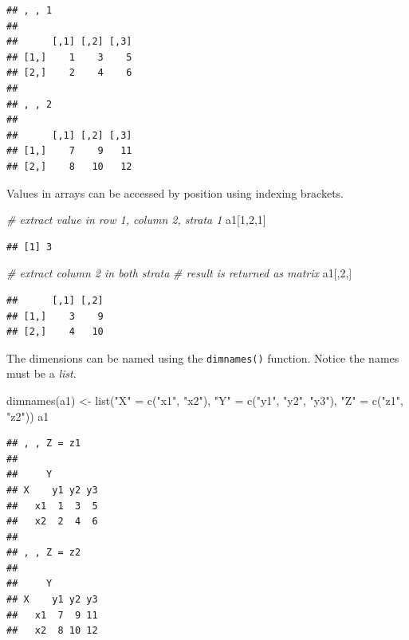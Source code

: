 \documentclass[
]{book}
\newenvironment{Shaded}{\begin{snugshade}}{\end{snugshade}}
\newcommand{\CommentTok}[1]{\textcolor[rgb]{0.56,0.35,0.01}{\textit{#1}}}
\newcommand{\DecValTok}[1]{\textcolor[rgb]{0.00,0.00,0.81}{#1}}
\newcommand{\FunctionTok}[1]{\textcolor[rgb]{0.00,0.00,0.00}{#1}}
\newcommand{\NormalTok}[1]{#1}
\newcommand{\OtherTok}[1]{\textcolor[rgb]{0.56,0.35,0.01}{#1}}
\newcommand{\StringTok}[1]{\textcolor[rgb]{0.31,0.60,0.02}{#1}}
\begin{document}
\begin{verbatim}
## , , 1
## 
##      [,1] [,2] [,3]
## [1,]    1    3    5
## [2,]    2    4    6
## 
## , , 2
## 
##      [,1] [,2] [,3]
## [1,]    7    9   11
## [2,]    8   10   12
\end{verbatim}

Values in arrays can be accessed by position using indexing brackets.

\begin{Shaded}
\begin{Highlighting}[]
\CommentTok{\# extract value in row 1, column 2, strata 1}
\NormalTok{a1[}\DecValTok{1}\NormalTok{,}\DecValTok{2}\NormalTok{,}\DecValTok{1}\NormalTok{]}
\end{Highlighting}
\end{Shaded}

\begin{verbatim}
## [1] 3
\end{verbatim}

\begin{Shaded}
\begin{Highlighting}[]
\CommentTok{\# extract column 2 in both strata}
\CommentTok{\# result is returned as matrix}
\NormalTok{a1[,}\DecValTok{2}\NormalTok{,]}
\end{Highlighting}
\end{Shaded}

\begin{verbatim}
##      [,1] [,2]
## [1,]    3    9
## [2,]    4   10
\end{verbatim}

The dimensions can be named using the \texttt{dimnames()} function. Notice the names must be a \emph{list}.

\begin{Shaded}
\begin{Highlighting}[]
\FunctionTok{dimnames}\NormalTok{(a1) }\OtherTok{\textless{}{-}} \FunctionTok{list}\NormalTok{(}\StringTok{"X"} \OtherTok{=} \FunctionTok{c}\NormalTok{(}\StringTok{"x1"}\NormalTok{, }\StringTok{"x2"}\NormalTok{), }
                     \StringTok{"Y"} \OtherTok{=} \FunctionTok{c}\NormalTok{(}\StringTok{"y1"}\NormalTok{, }\StringTok{"y2"}\NormalTok{, }\StringTok{"y3"}\NormalTok{), }
                     \StringTok{"Z"} \OtherTok{=} \FunctionTok{c}\NormalTok{(}\StringTok{"z1"}\NormalTok{, }\StringTok{"z2"}\NormalTok{))}
\NormalTok{a1}
\end{Highlighting}
\end{Shaded}

\begin{verbatim}
## , , Z = z1
## 
##     Y
## X    y1 y2 y3
##   x1  1  3  5
##   x2  2  4  6
## 
## , , Z = z2
## 
##     Y
## X    y1 y2 y3
##   x1  7  9 11
##   x2  8 10 12
\end{verbatim}
\end{document}
